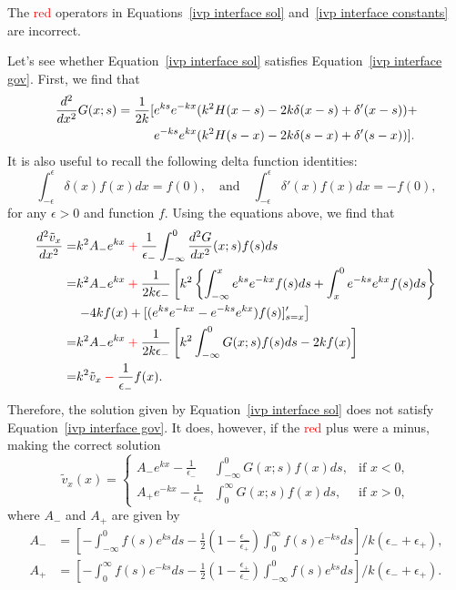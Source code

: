 \documentclass[12pt, draft]{../style-files/ociamthesis}
\begin{document}
The \textcolor{red}{red} operators in Equations~\eqref{ivp interface sol} and~\eqref{ivp interface constants} are incorrect.

Let's see whether Equation~\eqref{ivp interface sol} satisfies Equation~\eqref{ivp interface gov}. First, we find that
\begin{align}
\frac{d^2}{dx^2} G(x;s) = \frac{1}{2k}[& e^{ks}e^{-kx}(k^2H(x-s) - 2k\delta(x-s) + \delta'(x-s)) + \notag \\
& e^{-ks}e^{kx}(k^2H(s-x) - 2k\delta(s-x) + \delta'(s-x))].
\end{align}
It is also useful to recall the following delta function identities:
\begin{equation}
\int_{-\epsilon}^\epsilon \delta(x)f(x) dx = f(0), \quad \text{and} \quad \int_{-\epsilon}^\epsilon \delta'(x)f(x) dx = -f(0),
\end{equation}
for any $\epsilon > 0$ and function $f$. Using the equations above, we find that
\begin{align}
\frac{d^2\tilde{v}_x}{dx^2} = & k^2A_-e^{kx} \: \textcolor{red}{+} \: \frac{1}{\epsilon_-}\int_{-\infty}^0 \frac{d^2G}{dx^2}(x;s) f(s) ds \\
= & k^2A_-e^{kx} \: \textcolor{red}{+} \: \frac{1}{2k\epsilon_-}\left[k^2\left\{\int_{-\infty}^x e^{ks}e^{-kx}f(s) ds  + \int_x^0 e^{-ks}e^{kx}f(s) ds\right\} \right. \\
& \left.- 4kf(x) + [(e^{ks}e^{-kx}-e^{-ks}e^{kx})f(s)]'_{s=x} \right] \\
= & k^2A_-e^{kx} \: \textcolor{red}{+} \: \frac{1}{2k\epsilon_-}\left[k^2\int_{-\infty}^0 G(x;s)f(s) ds - 2kf(x) \right] \\
= & k^2\tilde{v}_x \: \textcolor{red}{-} \: \frac{1}{\epsilon_-}f(x).
\label{ivp interface error}
\end{align}
Therefore, the solution given by Equation~\eqref{ivp interface sol} does not satisfy Equation~\eqref{ivp interface gov}. It does, however, if the \textcolor{red}{red} plus were a minus, making the correct solution 
\begin{equation}
\tilde{v}_x(x) = \left\{
\begin{aligned}
A_-e^{kx} - \frac{1}{\epsilon_-} & \int_{-\infty}^{0} G(x;s)f(x)ds, & \text{if  } x<0,\\
A_+e^{-kx} - \frac{1}{\epsilon_+} & \int_{0}^{\infty} G(x;s)f(x)ds, & \text{if  } x>0,
\end{aligned}
\right.
\label{ivp interface sol correct}
\end{equation}
where $A_-$ and $A_+$ are given by
\begin{align}
A_- & = \left[- \int_{-\infty}^0 f(s)e^{ks} ds - \frac{1}{2}\left(1 - \frac{\epsilon_-}{\epsilon_+}\right)\int_0^\infty f(s)e^{-ks} ds\right] / k(\epsilon_- + \epsilon_+), \\
A_+ & = \left[-\int_0^\infty f(s)e^{-ks} ds - \frac{1}{2}\left(1 - \frac{\epsilon_+}{\epsilon_-}\right)\int_{-\infty}^0 f(s)e^{ks} ds\right] / k(\epsilon_- + \epsilon_+).
\end{align}
\end{document}
